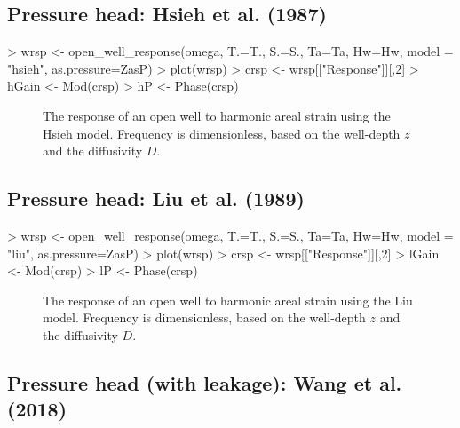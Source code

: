 \documentclass[12pt]{article}
\begin{document}
\clearpage
\subsection{Pressure head: Hsieh et al. (1987)}

\begin{Schunk}
\begin{Sinput}
> wrsp <- open_well_response(omega, T.=T., S.=S.,  Ta=Ta, Hw=Hw, model = "hsieh", as.pressure=ZasP)
> plot(wrsp)
> crsp <- wrsp[["Response"]][,2]
> hGain <- Mod(crsp)
> hP <- Phase(crsp)
\end{Sinput}
\end{Schunk}

\begin{figure}[htb!]
\begin{center}
\caption{The response of an open well to harmonic areal strain using
the Hsieh model. 
Frequency is dimensionless, based on the well-depth $z$ and the diffusivity $D$.
}
\label{fig:owrsp-hsi}
\end{center}
\end{figure}

\clearpage
\subsection{Pressure head: Liu et al. (1989)}

\begin{Schunk}
\begin{Sinput}
> wrsp <- open_well_response(omega, T.=T., S.=S.,  Ta=Ta, Hw=Hw, model = "liu", as.pressure=ZasP)
> plot(wrsp)
> crsp <- wrsp[["Response"]][,2]
> lGain <- Mod(crsp)
> lP <- Phase(crsp)
\end{Sinput}
\end{Schunk}

\begin{figure}[htb!]
\begin{center}
\caption{The response of an open well to harmonic areal strain using
the Liu model. 
Frequency is dimensionless, based on the well-depth $z$ and the diffusivity $D$.
}
\label{fig:owrsp-liu}
\end{center}
\end{figure}



\clearpage
\subsection{Pressure head (with leakage): Wang et al. (2018)}
\end{document}
